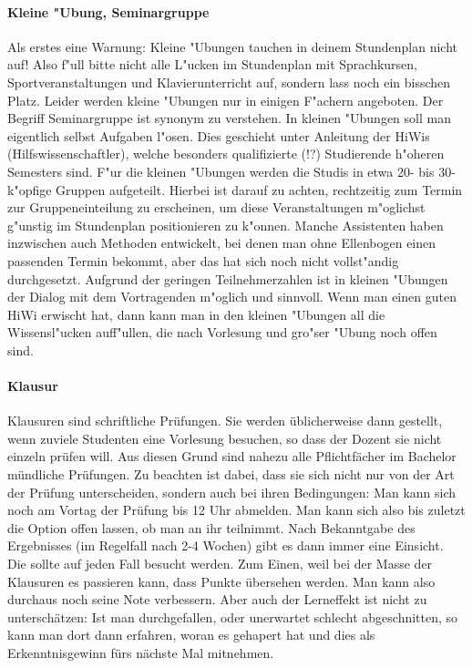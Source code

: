 \begin{multicols}{2}
\paragraph*{Kleine "Ubung, Seminargruppe}

Als erstes eine Warnung: Kleine "Ubungen tauchen in deinem Stundenplan nicht auf!
Also f"ull bitte nicht alle L"ucken im
Stundenplan mit Sprachkursen, Sportveranstaltungen und Klavierunterricht auf,
sondern lass noch ein bisschen Platz. Leider werden kleine "Ubungen nur in
einigen F"achern angeboten. Der Begriff Seminargruppe ist synonym zu verstehen.
In kleinen "Ubungen soll man eigentlich selbst Aufgaben l"osen. Dies geschieht
unter Anleitung der HiWis (Hilfswissenschaftler), welche besonders qualifizierte
(!?) Studierende h"oheren Semesters sind. F"ur die kleinen "Ubungen werden die
Studis in etwa 20- bis 30-k"opfige Gruppen aufgeteilt. Hierbei ist darauf zu
achten, rechtzeitig zum Termin zur Gruppeneinteilung zu erscheinen, um diese
Veranstaltungen m"oglichst g"unstig im Stundenplan positionieren zu k"onnen.
Manche Assistenten haben inzwischen auch Methoden entwickelt, bei denen man
ohne Ellenbogen einen passenden Termin bekommt, aber das hat sich noch nicht
vollst"andig durchgesetzt. Aufgrund der geringen Teilnehmerzahlen ist in
kleinen "Ubungen der Dialog mit dem Vortragenden m"oglich und sinnvoll. Wenn
man einen guten HiWi erwischt hat, dann kann man in den kleinen "Ubungen all
die Wissensl"ucken auff"ullen, die nach Vorlesung und gro"ser "Ubung noch offen
sind.
\paragraph*{Klausur}
Klausuren sind schriftliche Prüfungen. Sie werden üblicherweise dann
gestellt, wenn zuviele Studenten eine Vorlesung besuchen, so dass der
Dozent sie nicht einzeln prüfen will. Aus diesen Grund sind nahezu
alle Pflichtfächer im Bachelor mündliche Prüfungen. Zu beachten ist
dabei, dass sie sich nicht nur von der Art der Prüfung unterscheiden,
sondern auch bei ihren Bedingungen: Man kann sich noch am Vortag der
Prüfung bis 12 Uhr abmelden. Man kann sich also bis zuletzt die Option
offen lassen, ob man an ihr teilnimmt. Nach Bekanntgabe des
Ergebnisses (im Regelfall nach 2-4 Wochen) gibt es dann immer eine
Einsicht. Die sollte auf jeden Fall besucht werden. Zum Einen, weil
bei der Masse der Klausuren es passieren kann, dass Punkte übersehen
werden. Man kann also durchaus noch seine Note verbessern. Aber auch
der Lerneffekt ist nicht zu unterschätzen: Ist man durchgefallen, oder
unerwartet schlecht abgeschnitten, so kann man dort dann erfahren,
woran es gehapert hat und dies als Erkenntnisgewinn fürs nächste Mal mitnehmen.


\end{multicols}
